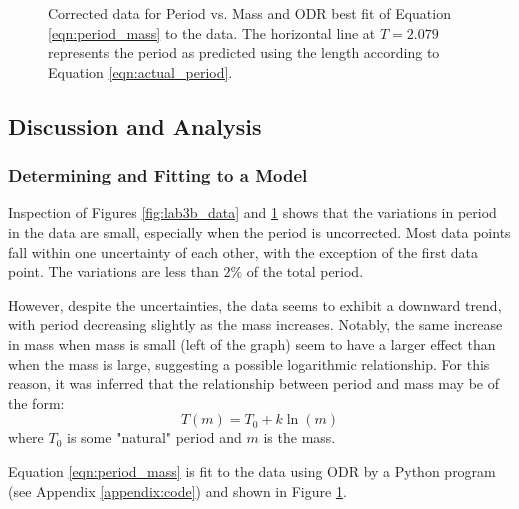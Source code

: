 \documentclass[aps,twocolumn,secnumarabic,nobalancelastpage,amsmath,amssymb,nofootinbib,floatfix,letterpaper]{revtex4}
\begin{document}
\begin{figure}[htbp]
    \caption{Corrected data for Period vs. Mass and ODR best fit of Equation \ref{eqn:period_mass} to the data.
        The horizontal line at \(T = 2.079\) represents the period as predicted using the length according to Equation \ref{eqn:actual_period}.}
    \label{fig:lab3b_data_corrected}
\end{figure}

\subsection{Discussion and Analysis}
\label{sec:lab3b_analysis}

\subsubsection{Determining and Fitting to a Model}

Inspection of Figures \ref{fig:lab3b_data} and \ref{fig:lab3b_data_corrected} shows that the variations in period in the
data are small, especially when the period is uncorrected. Most data points fall within one uncertainty of each
other, with the exception of the first data point. The variations are less than \(2\%\) of the total period.

However, despite the uncertainties, the data seems to exhibit a downward trend, with period decreasing slightly as the
mass increases. Notably, the same increase in mass when mass is small (left of the graph) seem to have a larger effect
than when the mass is large, suggesting a possible logarithmic relationship. For this reason, it was inferred that the
relationship between period and mass may be of the form:
\begin{equation}
    T(m) = T_0 + k\ln(m)
    \label{eqn:period_mass}
\end{equation}
where \(T_0\) is some "natural" period and \(m\) is the mass.

Equation \ref{eqn:period_mass} is fit to the data using ODR by a Python program (see Appendix \ref{appendix:code}) and
shown in Figure \ref{fig:lab3b_data_corrected}.
\end{document}
